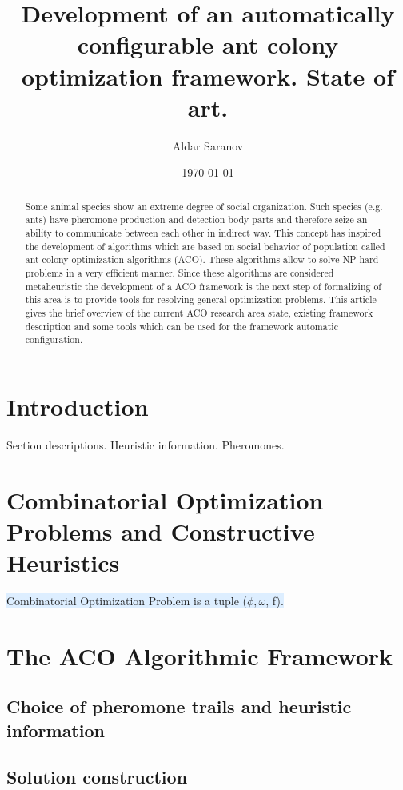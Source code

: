 \documentclass[12pt]{article}
\author{Aldar Saranov}
\date{\today}
\title{Development of an automatically configurable ant colony optimization framework. State of art.}
\begin{document}
\maketitle 
\newpage

\tableofcontents
\newpage

\begin{abstract}
Some animal species show an extreme degree of social organization. Such species (e.g. ants) have pheromone production and detection body parts and therefore seize an ability to communicate between each other in indirect way. This concept has inspired the development of algorithms which are based on social behavior of population called ant colony optimization algorithms (ACO). These algorithms allow to solve NP-hard problems in a very efficient manner. Since these algorithms are considered metaheuristic the development of a ACO framework is the next step of formalizing of this area is to provide tools for resolving general optimization problems. This article gives the brief overview of the current ACO research area state, existing framework description and some tools which can be used for the framework automatic configuration.
\end{abstract}

\section{Introduction}
Section descriptions.
Heuristic information.
Pheromones.

\section{Combinatorial Optimization Problems and Constructive
Heuristics}

\colorbox{def}{Combinatorial Optimization Problem is a tuple ($\phi,\omega$, f).}\\


\section{The ACO Algorithmic Framework}

\subsection{Choice of pheromone trails and heuristic information}

\subsection{Solution construction}
\end{document}
